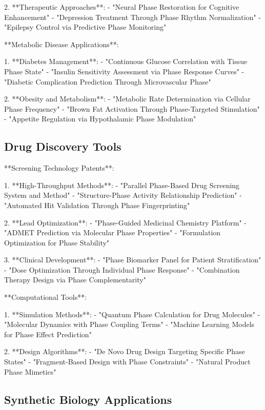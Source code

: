 \documentclass[12pt,a4paper]{report}
\begin{document}
2. **Therapeutic Approaches**:
   - "Neural Phase Restoration for Cognitive Enhancement"
   - "Depression Treatment Through Phase Rhythm Normalization"
   - "Epilepsy Control via Predictive Phase Monitoring"

**Metabolic Disease Applications**:

1. **Diabetes Management**:
   - "Continuous Glucose Correlation with Tissue Phase State"
   - "Insulin Sensitivity Assessment via Phase Response Curves"
   - "Diabetic Complication Prediction Through Microvascular Phase"

2. **Obesity and Metabolism**:
   - "Metabolic Rate Determination via Cellular Phase Frequency"
   - "Brown Fat Activation Through Phase-Targeted Stimulation"
   - "Appetite Regulation via Hypothalamic Phase Modulation"

\subsection{Drug Discovery Tools}

**Screening Technology Patents**:

1. **High-Throughput Methods**:
   - "Parallel Phase-Based Drug Screening System and Method"
   - "Structure-Phase Activity Relationship Prediction"
   - "Automated Hit Validation Through Phase Fingerprinting"

2. **Lead Optimization**:
   - "Phase-Guided Medicinal Chemistry Platform"
   - "ADMET Prediction via Molecular Phase Properties"
   - "Formulation Optimization for Phase Stability"

3. **Clinical Development**:
   - "Phase Biomarker Panel for Patient Stratification"
   - "Dose Optimization Through Individual Phase Response"
   - "Combination Therapy Design via Phase Complementarity"

**Computational Tools**:

1. **Simulation Methods**:
   - "Quantum Phase Calculation for Drug Molecules"
   - "Molecular Dynamics with Phase Coupling Terms"
   - "Machine Learning Models for Phase Effect Prediction"

2. **Design Algorithms**:
   - "De Novo Drug Design Targeting Specific Phase States"
   - "Fragment-Based Design with Phase Constraints"
   - "Natural Product Phase Mimetics"

\subsection{Synthetic Biology Applications}
\end{document}
